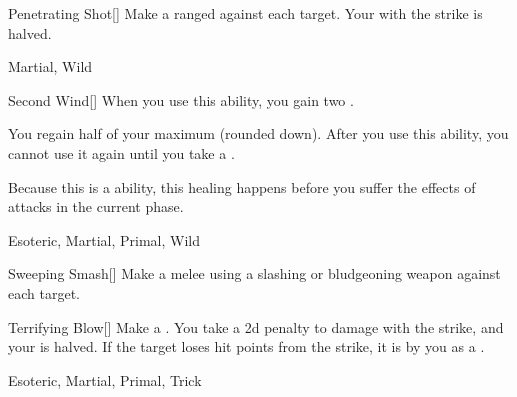 \lowercase{\hypertarget{maneuver:Penetrating Shot}{}}\label{maneuver:Penetrating Shot}
\hypertarget{maneuver:Penetrating Shot}{}
\begin{freeability}[Rank 4]{Penetrating Shot}[]
Make a ranged  against each target.
Your  with the strike is halved.


 Martial, Wild
\end{freeability}
\vspace{0.25em}



\lowercase{\hypertarget{maneuver:Second Wind}{}}\label{maneuver:Second Wind}
\hypertarget{maneuver:Second Wind}{}
\begin{freeability}[Rank 4]{Second Wind}[]
When you use this ability, you gain two .

You regain half of your maximum  (rounded down).
After you use this ability, you cannot use it again until you take a .

Because this is a  ability, this healing happens before you suffer the effects of attacks in the current phase.


 Esoteric, Martial, Primal, Wild
\end{freeability}
\vspace{0.25em}



\lowercase{\hypertarget{maneuver:Sweeping Smash}{}}\label{maneuver:Sweeping Smash}
\hypertarget{maneuver:Sweeping Smash}{}
\begin{freeability}[Rank 4]{Sweeping Smash}[]
Make a melee  using a slashing or bludgeoning weapon against each target.


\end{freeability}
\vspace{0.25em}



\lowercase{\hypertarget{maneuver:Terrifying Blow}{}}\label{maneuver:Terrifying Blow}
\hypertarget{maneuver:Terrifying Blow}{}
\begin{freeability}[Rank 4]{Terrifying Blow}[]
Make a .
You take a \minus2d penalty to damage with the strike, and your  is halved.
If the target loses hit points from the strike, it is  by you as a .


 Esoteric, Martial, Primal, Trick
\end{freeability}
\vspace{0.25em}



